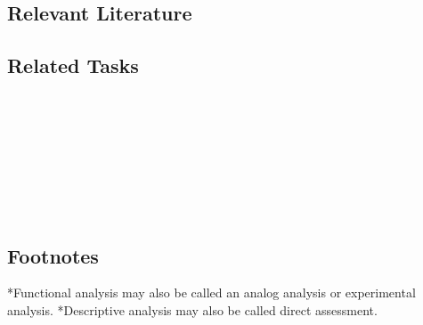 \subsection{Relevant Literature}
\begin{refsection}
\nocite{test,alang2017police,clayton2018black}
\printbibliography[heading=none]
\end{refsection}
%
\subsection{Related Tasks}
\fourbThree{}\\
\fourbFive{}\\
\foureOne{}\\
\fourhOne{}\\
\fourhThree{}\\
\fourhFive{}\\
\fouriThree{}\\
%
\subsection{Footnotes}
*Functional analysis may also be called an analog analysis or experimental analysis.
*Descriptive analysis may also be called direct assessment.
%
%
%
%
%
%
%

